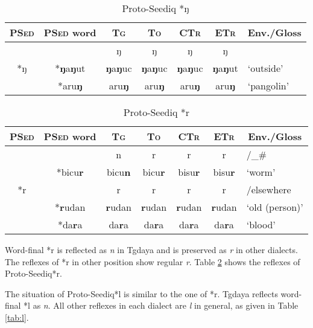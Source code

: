 \documentclass[12pt]{article}
\newcommand{\psed}{\textsc{PSed}\xspace}
\newcommand{\psedf}{Proto-Seediq\xspace}
\newcommand{\stg}{\textsc{Tg}\xspace}
\newcommand{\stgf}{Tgdaya\xspace}
\newcommand{\sto}{\textsc{To}\xspace}
\newcommand{\sctr}{\textsc{CTr}\xspace}
\newcommand{\setr}{\textsc{ETr}\xspace}
\begin{document}
\begin{table}[!htbp]
\centering
\caption{Proto-Seediq *ŋ}
\label{tab:ŋ}
\begin{tabular}{c|c|cccc|l}
\textbf{\psed} & \textbf{\psed word}      & \textbf{\stg} & \textbf{\sto} & \textbf{\sctr} & \textbf{\setr} & \multicolumn{1}{c}{\textbf{Env./Gloss}} \\ \hline
\multirow{3}{*}{*ŋ} & & ŋ   & ŋ   & ŋ   & ŋ     \\ \cline{2-7}
                    & *\textbf{ŋ}a\textbf{ŋ}ut & \textbf{ŋ}a\textbf{ŋ}uc & \textbf{ŋ}a\textbf{ŋ}uc & \textbf{ŋ}a\textbf{ŋ}uc & \textbf{ŋ}a\textbf{ŋ}ut & `outside' \\
                    & *aru\textbf{ŋ}  & aru\textbf{ŋ} & aru\textbf{ŋ} & aru\textbf{ŋ} & aru\textbf{ŋ} & `pangolin' \\ \hline
\end{tabular}
\end{table}

\begin{table}[!htbp]
\centering
\caption{Proto-Seediq *r}
\label{tab:r}
\begin{tabular}{c|c|cccc|l}
\textbf{\psed} & \textbf{\psed word}      & \textbf{\stg} & \textbf{\sto} & \textbf{\sctr} & \textbf{\setr} & \multicolumn{1}{c}{\textbf{Env./Gloss}} \\ \hline
\multirow{5}{*}{*r} &  & n & r & r & r & /\_\# \\ \cline{2-7}
                    & *bicu\textbf{r} & bicu\textbf{n} & bicu\textbf{r} & bisu\textbf{r} & bisu\textbf{r} & `worm' \\ \cline{2-7}
                    & & r & r & r & r & /elsewhere \\ \cline{2-7}
                    & *\textbf{r}udan & \textbf{r}udan & \textbf{r}udan & \textbf{r}udan & \textbf{r}udan & `old (person)' \\
                    & *da\textbf{r}a & da\textbf{r}a & da\textbf{r}a & da\textbf{r}a & da\textbf{r}a & `blood'               \\ \hline
\end{tabular}
\end{table}

Word-final *r is reflected as \textit{n} in \stgf and is preserved as \textit{r} in other dialects. The reflexes of *r in other position show regular \textit{r}. Table \ref{tab:r} shows the reflexes of \psedf *r.  

The situation of \psedf *l is similar to the one of *r. \stgf reflects word-final *l as \textit{n}. All other reflexes in each dialect are \textit{l} in general, as given in Table \ref{tab:l}. 
\end{document}
